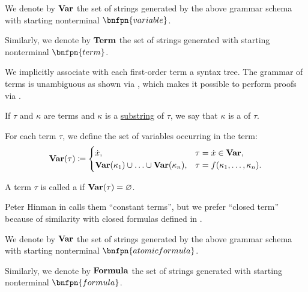 \begin{definition}
\begin{thmenum}
     We denote by \( \op*{Var} \) the set of strings generated by the above grammar schema with starting nonterminal \( \bnfpn{variable} \).

     Similarly, we denote by \( \op*{Term} \) the set of strings generated with starting nonterminal \( \bnfpn{term} \).

    We implicitly associate with each first-order term a syntax tree. The grammar of terms is unambiguous as shown via , which makes it possible to perform proofs via .

     If \( \tau \) and \( \kappa \) are terms and \( \kappa \) is a \hyperref[def:formal_language/substring]{substring} of \( \tau \), we say that \( \kappa \) is a  of \( \tau \).

     For each term \( \tau \), we define the set of variables occurring in the term:
    \begin{equation}\label{eq:def:first_order_syntax/term_variables}
      \op*{Var}(\tau) \coloneqq \begin{cases}
        \synx,                                                            &\tau = \synx \in \op*{Var}, \\
        \op*{Var}(\kappa_1) \cup \ldots \cup \op*{Var}(\kappa_n), &\tau = f(\kappa_1, \ldots, \kappa_n).
      \end{cases}
    \end{equation}

     A term \( \tau \) is called a  if \( \op*{Var}(\tau) = \varnothing \).

    Peter Hinman in  calls them \enquote{constant terms}, but we prefer \enquote{closed term} because of similarity with closed formulas defined in .

     We denote by \( \op*{Var} \) the set of strings generated by the above grammar schema with starting nonterminal \( \bnfpn{atomic formula} \).

     Similarly, we denote by \( \op*{Formula} \) the set of strings generated with starting nonterminal \( \bnfpn{formula} \).


\end{thmenum}
\end{definition}
